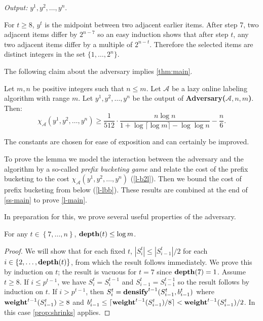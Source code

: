 \documentclass[unicode,review]{siamart1116}
\newcommand{\A}{\mathcal{A}}
\newcommand{\natInt}[2]{ \left\{ #1, \dotsc, #2 \right\} }
\newcommand{\weight}{{\rm {\bf weight}}}
\newcommand{\depth}{{\rm {\bf depth}}}
\newcommand{\densify}{{\rm {\bf densify}}}
\numberwithin{theorem}{section}
\begin{document}
\noindent\emph{Output:} $y^1,y^2,\dotsc,y^n$.


\medskip
For $t \geq 8$, $y^t$ is the midpoint between two adjacent earlier items.
After step 7, two adjacent items differ by $2^{n-7}$ so an easy induction shows that
after step $t$, any two adjacent items differ by a multiple of $2^{n-t}$.  Therefore the selected items
are distinct integers in the set $\{1,\ldots,2^n\}$.


The following claim about the adversary implies \cref{thm:main}.

\begin{lemma}\label{l-main}
Let $m,n$ be positive integers such that $n \le m$. 
Let $\A$ be a lazy online labeling algorithm with range $m$.
Let $y^1,y^2,\dotsc,y^n$ be the output of {\bf Adversary($\A,n,m$)}.
Then:
$$\chi_\A(y^1,y^2,\dotsc,y^n) \ge \frac{1}{512} \cdot \frac{n \log n}{ 1 + \log \lceil \log m \rceil - \log \log n} - \frac{n}{6}.$$
\end{lemma}

 The constants are chosen for
ease of exposition and can certainly be improved.
%


To prove the lemma we model the interaction between the adversary and the algorithm by  
a so-called \emph{prefix bucketing game} and relate the cost of the prefix bucketing to the cost $\chi_\A(y^1,y^2,\dotsc,y^n)$ (\cref{l-b2l}).  Then
we  bound the cost of  prefix bucketing from below (\cref{l-lbb}). These results are combined at the end of \cref{ss-main} to prove \cref{l-main}.

In preparation for this, we prove several useful properties of the adversary.

\begin{lemma}
For any $t\in \natInt{7}{n}$, $\depth(t)\le \log m$.
\end{lemma}

\begin{proof}
We will show that for each fixed $t$, $|S^t_{i}| \leq |S^t_{i-1}|/2$ for each $i \in \natInt{2}{\depth(t)}$, from which the result
follows immediately.  We prove this by induction on $t$; the result is vacuous for $t=7$ since $\depth(7)=1$.
Assume $t \geq 8$.  If $i \leq p^{t-1}$, we have $S^t_i=S^{t-1}_i$ and $S^t_{i-1}=S^{t-1}_{i-1}$
so the result follows by induction on $t$.  If $i>p^{t-1}$, then $S^t_i=\densify^{t-1}(S^t_{i-1},b^t_{i-1})$
where $\weight^{t-1}(S^t_{i-1}) \geq 8$ and $b^t_{i-1} \leq \lceil \weight^{t-1}(S^t_{i-1})/8 \rceil < \weight^{t-1}(S^t_{i-1})/2$.
In this case \cref{prop:shrinks} applies. 
\end{proof}
\end{document}
